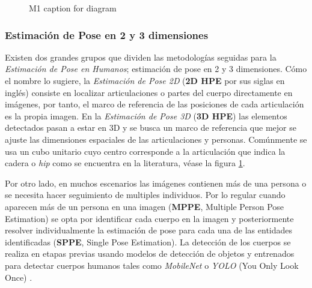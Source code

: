 \begin{figure}
\begin{center}
\caption{M1 caption for diagram} \label{fig:HPE-diagram}
\end{center} \end{figure}

\subsubsection{Estimación de Pose en 2 y 3 dimensiones}

Existen dos grandes grupos que dividen las metodologías seguidas para la \textit{Estimación de Pose en
Humanos}; estimación de pose en 2 y 3 dimensiones. Cómo el nombre lo sugiere, la \textit{Estimación
de Pose 2D} (\textbf{2D HPE} por sus siglas en inglés) consiste en localizar articulaciones o partes del cuerpo
directamente en imágenes, por tanto, el marco de referencia de las posiciones de cada articulación es la
propia imagen. En la \textit{Estimación de Pose 3D} (\textbf{3D HPE}) las elementos detectados pasan a estar en 3D
y se busca un marco de referencia que mejor se ajuste las dimensiones espaciales de las
articulaciones y personas. Comúnmente se usa un cubo unitario cuyo centro corresponde a la
articulación que indica la cadera o \textit{hip} como se encuentra en la literatura, véase la figura
\ref{fig:HPE-diagram}.

Por otro lado, en muchos escenarios las imágenes contienen más de una persona o se necesita hacer seguimiento
de multiples individuos. Por lo regular cuando aparecen más de un persona en una imagen
(\textbf{MPPE}, Multiple Person Pose Estimation)
se opta por identificar cada cuerpo en la imagen y posteriormente resolver individualmente
la estimación de pose para cada una de las entidades identificadas (\textbf{SPPE}, Single Pose Estimation).
La detección de los cuerpos se realiza en
etapas previas usando modelos de detección de objetos y entrenados para detectar cuerpos
humanos tales como \textit{MobileNet} \cite{DBLP:journals/corr/RenHG015}
\cite{DBLP:journals/corr/HowardZCKWWAA17} \cite{DBLP:journals/corr/abs-1801-04381} o \textit{YOLO}
(You Only Look Once) \cite{DBLP:journals/corr/RedmonDGF15} \cite{DBLP:journals/corr/abs-2004-10934}.

